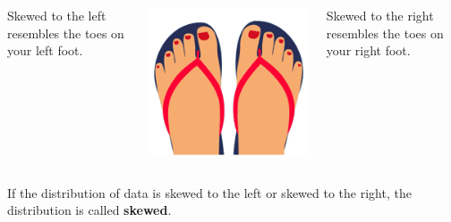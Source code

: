 \documentclass{beamer}
\begin{document}
\begin{frame}
\begin{note}
\begin{columns}
\begin{column}{0.18\textwidth}
Skewed to the left resembles the toes on your left foot.
\end{column}
\begin{column}{0.54\textwidth}
\includegraphics[width=\textwidth]{feet.png}
\end{column}
\begin{column}{0.18\textwidth}
Skewed to the right resembles the toes on your right foot.
\end{column}
\end{columns}
\end{note}\pause

\begin{definition}
If the distribution of data is skewed to the left or skewed to the right, the distribution is called \textbf{skewed}.
\end{definition}
\end{frame}
\end{document}
